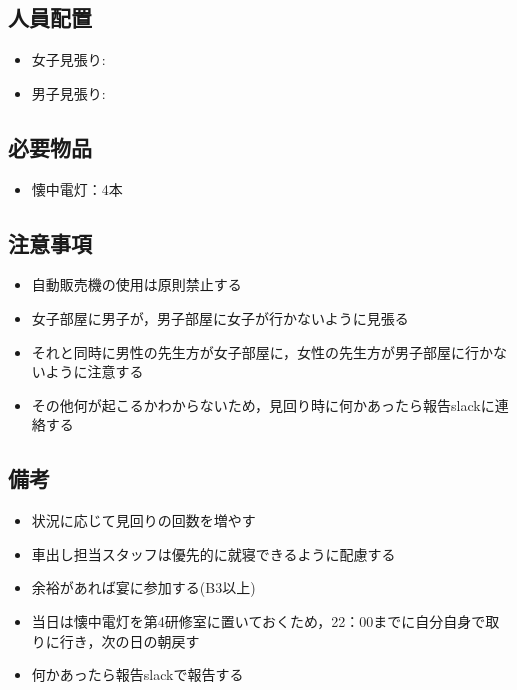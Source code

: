 




\subsection{人員配置}
\begin{itemize}
\item 女子見張り:
\item 男子見張り:
\end{itemize}


\subsection{必要物品}
\begin{itemize}
\item 懐中電灯：4本
\end{itemize}


\subsection{注意事項}
\begin{itemize}
\item 自動販売機の使用は原則禁止する
\item 女子部屋に男子が，男子部屋に女子が行かないように見張る
\item それと同時に男性の先生方が女子部屋に，女性の先生方が男子部屋に行かないように注意する
\item その他何が起こるかわからないため，見回り時に何かあったら報告slackに連絡する
\end{itemize}

\subsection{備考}
\begin{itemize}
\item 状況に応じて見回りの回数を増やす
\item 車出し担当スタッフは優先的に就寝できるように配慮する
\item 余裕があれば宴に参加する(B3以上)
\item 当日は懐中電灯を第4研修室に置いておくため，22：00までに自分自身で取りに行き，次の日の朝戻す
\item 何かあったら報告slackで報告する
\end{itemize}

%
